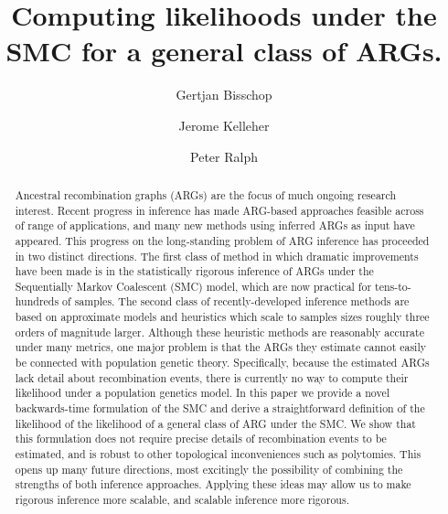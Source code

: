 \documentclass{article}
\begin{document}
\linenumbers
\title{Computing likelihoods under the SMC for a general class of ARGs.}

\author[1, $\dagger$]{Gertjan Bisschop}
\author[1]{Jerome Kelleher}
\author[3]{Peter Ralph}


\maketitle


\begin{abstract}
Ancestral recombination graphs (ARGs) are the focus of much ongoing research
interest. Recent progress in inference has made ARG-based approaches feasible
across of range of applications, and many new methods using inferred ARGs as
input have appeared. This progress on the long-standing problem of ARG
inference has proceeded in two distinct directions. The first
class of method in which dramatic improvements have been made is in the
statistically rigorous inference of ARGs under the Sequentially Markov
Coalescent (SMC) model, which are now practical for tens-to-hundreds of
samples. The second class of recently-developed inference methods are based on
approximate models and heuristics which scale to samples sizes roughly three
orders of magnitude larger. Although these heuristic methods are reasonably
accurate under many metrics, one major problem is that the ARGs they 
estimate cannot easily be connected with population genetic theory.
Specifically, because the estimated ARGs lack detail about recombination
events, there is currently no way to compute their likelihood
under a population genetics model. In this paper we provide a 
novel backwards-time formulation of the SMC 
and derive a straightforward definition of the likelihood
of the likelihood of a general class of ARG under the SMC. 
We show that this formulation does not require precise details of recombination events
to be estimated, and is robust to other topological inconveniences such as 
polytomies. This opens up many future directions, most excitingly the possibility
of combining the strengths of both inference approaches. Applying
these ideas may allow us to 
make rigorous inference more scalable, and scalable inference 
more rigorous.
\end{abstract}
\end{document}
